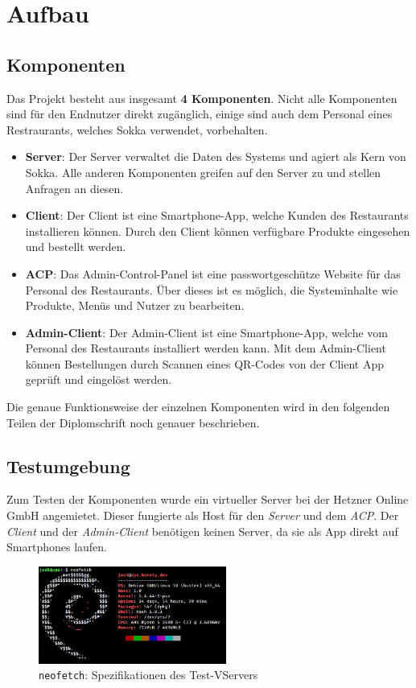 \chapter{Aufbau}

\section{Komponenten}

Das Projekt besteht aus insgesamt \textbf{4 Komponenten}. Nicht alle Komponenten sind für den Endnutzer direkt zugänglich, einige sind auch dem Personal eines Restraurants, welches Sokka verwendet, vorbehalten.

\begin{itemize}
    \item \textbf{Server}: Der Server verwaltet die Daten des Systems und agiert als Kern von Sokka. Alle anderen Komponenten greifen auf den Server zu und stellen Anfragen an diesen.
    \item \textbf{Client}: Der Client ist eine Smartphone-App, welche Kunden des Restaurants installieren können. Durch den Client können verfügbare Produkte eingesehen und bestellt werden.
    \item \textbf{ACP}: Das Admin-Control-Panel ist eine passwortgeschütze Website für das Personal des Restaurants. Über dieses ist es möglich, die Systeminhalte wie Produkte, Menüs und Nutzer zu bearbeiten.
    \item \textbf{Admin-Client}: Der Admin-Client ist eine Smartphone-App, welche vom Personal des Restaurants installiert werden kann. Mit dem Admin-Client können Bestellungen durch Scannen eines QR-Codes von der Client App geprüft und eingelöst werden.
\end{itemize}

Die genaue Funktionsweise der einzelnen Komponenten wird in den folgenden Teilen der Diplomschrift noch genauer beschrieben.

\section{Testumgebung}

Zum Testen der Komponenten wurde ein virtueller Server bei der Hetzner Online GmbH angemietet. Dieser fungierte als Host für den \textit{Server} und dem \textit{ACP}. Der \textit{Client} und der \textit{Admin-Client} benötigen keinen Server, da sie als App direkt auf Smartphones laufen.

\begin{figure}[ht]
    \centering
    \includegraphics[width=0.55\textwidth]{images/Intro/specs.png}
    \caption{\lstinline{neofetch}: Spezifikationen des Test-VServers}
\end{figure}

